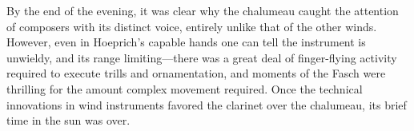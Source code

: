 By the end of the evening, it was clear why the chalumeau caught the attention of composers with its distinct voice, entirely unlike that of the other winds. However, even in Hoeprich’s capable hands one can tell the instrument is unwieldy, and its range limiting—there was a great deal of finger-flying activity required to execute trills and ornamentation, and moments of the Fasch were thrilling for the amount complex movement required. Once the technical innovations in wind instruments favored the clarinet over the chalumeau, its brief time in the sun was over.